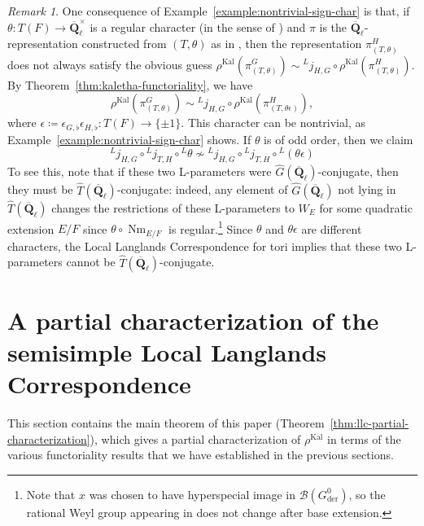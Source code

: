 \documentclass[reqno]{amsart}
\numberwithin{equation}{subsection}
\newcommand{\Q}{\mathbf{Q}}
\newcommand{\ol}[1]{\overline{#1}}
\newcommand{\wh}[1]{\widehat{#1}}
\newcommand{\co}{\colon}
\newcommand{\ld}{{}^L}
\newcommand\cB{\mathcal{B}}
\DeclareMathOperator{\Nm}{Nm}
\DeclareMathOperator{\Kal}{Kal}
\DeclareMathOperator{\der}{der}
\theoremstyle{remark}
\newtheorem{remark}[thm]{Remark}
\numberwithin{equation}{subsection}
\numberwithin{figure}{subsection}
\begin{document}
\begin{remark}\label{remark:nontrivial-sign-char}
One consequence of Example~\ref{example:nontrivial-sign-char} is that, if $\theta\co T(F) \to \ol\Q_\ell^\times$ is a regular character (in the sense of \cite[Definition 3.7.5]{Kal19}) and $\pi$ is the $\ol\Q_\ell$-representation constructed from $(T,\theta)$ as in \cite[Corollary 3.7.10]{Kal19}, then the representation $\pi^H_{(T,\theta)}$ does not always satisfy the obvious guess $\rho^{\Kal}\left(\pi^G_{(T,\theta)}\right) \sim \ld j_{H,G} \circ \rho^{\Kal}\left(\pi^H_{(T,\theta)}\right)$. By Theorem~\ref{thm:kaletha-functoriality}, we have
\[
\rho^{\Kal}\left(\pi^G_{(T,\theta)}\right) \sim \ld j_{H,G} \circ \rho^{\Kal}\left(\pi^H_{(T,\theta\epsilon)}\right),
\]
where $\epsilon\coloneqq \epsilon_{G,\flat}\epsilon_{H,\flat}\co T(F)\to\{\pm1\}$. This character can be nontrivial, as Example~\ref{example:nontrivial-sign-char} shows. If $\theta$ is of odd order, then we claim
\[
\ld j_{H,G}\circ\ld j_{T,H}\circ\ld\theta\not\sim\ld j_{H,G}\circ\ld j_{T,H}\circ\ld(\theta\epsilon)
\]
To see this, note that if these two L-parameters were $\wh G(\ol\Q_\ell)$-conjugate, then they must be $\wh T(\ol\Q_\ell)$-conjugate: indeed, any element of $\wh G(\ol\Q_\ell)$ not lying in $\wh T(\ol\Q_\ell)$ changes the restrictions of these L-parameters to $W_E$ for some quadratic extension $E/F$ since $\theta \circ \Nm_{E/F}$ is regular.\footnote{Note that $x$ was chosen to have hyperspecial image in $\cB(G^0_{\der})$, so the rational Weyl group appearing in \cite[Definition 3.7.5]{Kal19} does not change after base extension.} Since $\theta$ and $\theta\epsilon$ are different characters, the Local Langlands Correspondence for tori implies that these two L-parameters cannot be $\wh T(\ol\Q_\ell)$-conjugate.
\end{remark}












\section{A partial characterization of the semisimple Local Langlands Correspondence}\label{sec:partial-characterization}


This section contains the main theorem of this paper (Theorem~\ref{thm:llc-partial-characterization}), which gives a partial characterization of $\rho^{\Kal}$ in terms of the various functoriality results that we have established in the previous sections.
\end{document}
